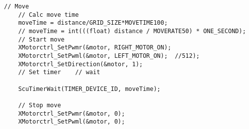 \documentclass[Main]{subfiles}
\begin{document}
	\begin{lstlisting}[caption=Example of simple forward movement, style=Code-C++, label=lst:move, basicstyle=\scriptsize]
	// Move
	// Calc move time
	moveTime = distance/GRID_SIZE*MOVETIME100;
	// moveTime = int(((float) distance / MOVERATE50) * ONE_SECOND);
	// Start move
	XMotorctrl_SetPwmr(&motor, RIGHT_MOTOR_ON);
	XMotorctrl_SetPwml(&motor, LEFT_MOTOR_ON);	//512);
	XMotorctrl_SetDirection(&motor, 1);
	// Set timer	// wait

	ScuTimerWait(TIMER_DEVICE_ID, moveTime);

	// Stop move
	XMotorctrl_SetPwmr(&motor, 0);
	XMotorctrl_SetPwml(&motor, 0);	
	\end{lstlisting}
	
\end{document}
